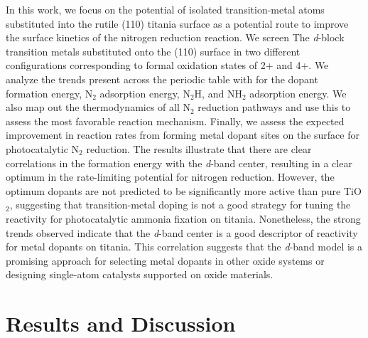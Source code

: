 In this work, we focus on the potential of isolated transition-metal atoms substituted into the rutile (110) titania surface as a potential route to improve the surface kinetics of the nitrogen reduction reaction. We screen The \textit{d}-block transition metals substituted onto the (110) surface in two different configurations corresponding to formal oxidation states of 2+ and 4+. 
We analyze the trends present across the periodic table with for the dopant formation energy, N$_2$ adsorption energy, N$_2$H, and NH$_2$ adsorption energy. We also map out the thermodynamics of all N$_2$ reduction pathways and use this to assess the most favorable reaction mechanism. Finally, we assess the expected improvement in reaction rates from forming metal dopant sites on the surface for photocatalytic N$_2$ reduction. The results illustrate that there are clear correlations in the formation energy with the \textit{d}-band center, resulting in a clear optimum in the rate-limiting potential for nitrogen reduction. However, the optimum dopants are not predicted to be significantly more active than pure TiO$_2$, suggesting that transition-metal doping is not a good strategy for tuning the reactivity for photocatalytic ammonia fixation on titania. Nonetheless, the strong trends observed indicate that the \textit{d}-band center is a good descriptor of reactivity for metal dopants on titania. This correlation suggests that the \textit{d}-band model is a promising approach for selecting metal dopants in other oxide systems or designing single-atom catalysts supported on oxide materials.

\section{Results and Discussion}

